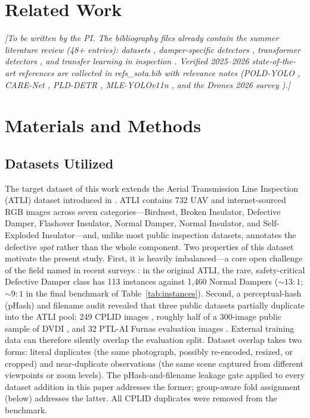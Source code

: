 \documentclass[conference]{IEEEtran}
\newcommand{\dd}{Defective Damper}
\begin{document}
\section{Related Work}
\textit{[To be written by the PI. The bibliography files already contain the summer literature review (48+ entries): datasets \cite{tao2020insulator,shuang2023rsin,abdelfattah2020ttpla,vieiraesilva2021stnplad,oliveira2022furnas}, damper-specific detectors \cite{zhang2024dsanet,bao2021pmayolo,bao2022bcyolo,huang2023damper,liu2021slippage}, transformer detectors \cite{zhang2023padetr,zhang2024hcvit,carion2020detr}, and transfer learning in inspection \cite{shakiba2022insulator,pradeep2025insulator}. Verified 2025--2026 state-of-the-art references are collected in refs\_sota.bib with relevance notes (POLD-YOLO \cite{hu2026poldyolo}, CARE-Net \cite{zhou2026carenet}, PLD-DETR \cite{chen2025plddetr}, MLE-YOLOv11n \cite{wang2026mleyolo}, and the Drones 2026 survey \cite{fan2026survey}).]}

\section{Materials and Methods}
\label{sec:methods}

\subsection{Datasets Utilized}
\label{sec:datasets}
The target dataset of this work extends the Aerial Transmission Line Inspection (ATLI) dataset introduced in \cite{tsai2025atli}. ATLI contains 732 UAV and internet-sourced RGB images across seven categories---Birdnest, Broken Insulator, \dd{}, Flashover Insulator, Normal Damper, Normal Insulator, and Self-Exploded Insulator---and, unlike most public inspection datasets, annotates the defective \emph{spot} rather than the whole component. Two properties of this dataset motivate the present study. First, it is heavily imbalanced---a core open challenge of the field named in recent surveys \cite{faisal2025powerline,fan2026survey}: in the original ATLI, the rare, safety-critical \dd{} class has 113 instances against 1{,}460 Normal Dampers (${\sim}13{:}1$; ${\sim}9{:}1$ in the final benchmark of Table~\ref{tab:instances}). Second, a perceptual-hash (pHash) and filename audit revealed that three public datasets partially duplicate into the ATLI pool: 249 CPLID images \cite{tao2020insulator}, roughly half of a 300-image public sample of DVDI \cite{bao2022bcyolo}, and 32 PTL-AI Furnas evaluation images \cite{oliveira2022furnas}. External training data can therefore silently overlap the evaluation split. Dataset overlap takes two forms: literal duplicates (the same photograph, possibly re-encoded, resized, or cropped) and near-duplicate observations (the same scene captured from different viewpoints or zoom levels). The pHash-and-filename leakage gate applied to every dataset addition in this paper addresses the former; group-aware fold assignment (below) addresses the latter. All CPLID duplicates were removed from the benchmark.
\end{document}
